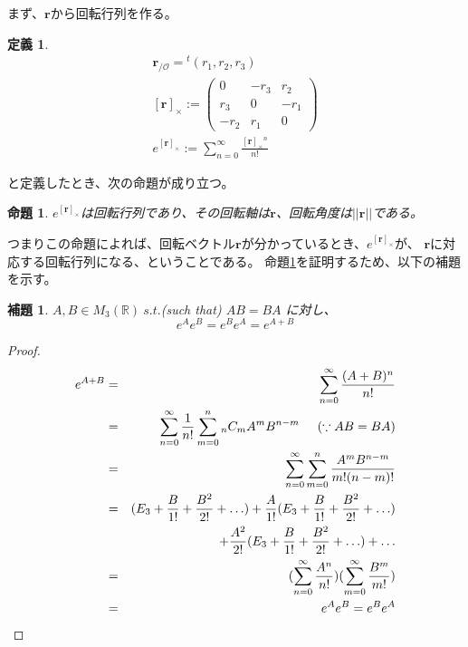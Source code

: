 \documentclass[10pt]{jarticle}
\newtheorem{Def}{定義}[section]
\newtheorem{Prp}{命題}[section]
\newtheorem{Lem}{補題}[section]
\begin{document}
まず、$\boldsymbol{r}$から回転行列を作る。
\begin{Def}
    \begin{eqnarray}
        \boldsymbol{r}_{/\mathcal{O}} = {}^t(r_1,r_2,r_3)\\
        {[\boldsymbol{r}]_{\times}} := 
        \left(
          \begin{array}{ccc}
              0 &-r_3 &r_2  \\
              r_3 & 0& -r_1 \\
              -r_2 & r_1& 0
          \end{array}
        \right) \\
        e^{[\boldsymbol{r}]_{\times}}:=\sum_{n=0}^{\infty}\frac{[\boldsymbol{r}]_{\times}{}^n}{n!} \label{eq:defe^r}
    \end{eqnarray}
\end{Def}

と定義したとき、次の命題が成り立つ。

\begin{Prp}\label{thm:rotvec}
    $e^{[\boldsymbol{r}]_{\times}}$は回転行列であり、その回転軸は$\boldsymbol{r}$、回転角度は$||\boldsymbol{r}||$である。
\end{Prp}


つまりこの命題によれば、回転ベクトル$\boldsymbol{r}$が分かっているとき、$e^{[\boldsymbol{r}]_{\times}}$が、
$\boldsymbol{r}$に対応する回転行列になる、ということである。
命題\ref{thm:rotvec}を証明するため、以下の補題を示す。

\begin{Lem} \label{lem:powerOfE}
    $A,B \in M_3(\mathbb{R}) \ s.t.$(such that)  $AB=BA$
    に対し、
    \begin{equation}
        e^A e^B = e^B e^A = e^{A+B}
    \end{equation}
\end{Lem}

\begin{proof}
    \begin{eqnarray}
        e^{A+B}&=&\sum_{n=0}^{\infty} \frac{(A+B)^n}{n!}\\
        &=&\sum_{n=0}^{\infty}\frac{1}{n!} \sum_{m=0}^n {}_nC_m A^m B^{n-m} \hspace{5mm}(\because AB=BA) \\
        &=&\sum_{n=0}^{\infty}\sum_{m=0}^n \frac{A^m B^{n-m}}{m! (n-m)!} \\
        &=&(E_3+\frac{B}{1!}+\frac{B^2}{2!}+\hdots)+\frac{A}{1!}(E_3+\frac{B}{1!}+\frac{B^2}{2!}+\hdots) \nonumber\\
        &&+\frac{A^2}{2!}(E_3+\frac{B}{1!}+\frac{B^2}{2!}+\hdots)+\hdots \\
        &=&(\sum_{n=0}^{\infty} \frac{A^n}{n!}) (\sum_{m=0}^{\infty} \frac{B^m}{m!}) \\
        &=&e^A e^B = e^B e^A
    \end{eqnarray}
\end{proof}
\end{document}
